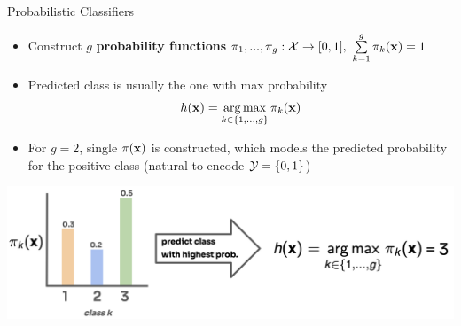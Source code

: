 \documentclass[11pt,compress,t,notes=noshow, xcolor=table]{beamer}
\begin{document}
\begin{vbframe}{Probabilistic Classifiers}
\begin{itemize}
\item Construct $g$ \textbf{probability functions} $\pi_1, ..., \pi_g: \mathcal{X} \to [0, 1],~\sum\limits_{k=1}^g \pi_{k}(\mathbf{x}) = 1$ 
\item Predicted class is usually the one with max probability
$$
h(\mathbf{x}) = \operatorname*{arg\,max}_{k \in \{1, \ldots, g\}} \pi_{k}(\mathbf{x})
$$ 
\item For $g = 2$, single $\pi(\mathbf{x})$ is constructed, which models the predicted probability for the positive class (natural to encode $\mathcal{Y} = \{0, 1\}$)
\end{itemize}

\begin{center}
  \includegraphics{figure_man/probabilities.png} 
\end{center}
\end{vbframe}
\end{document}
